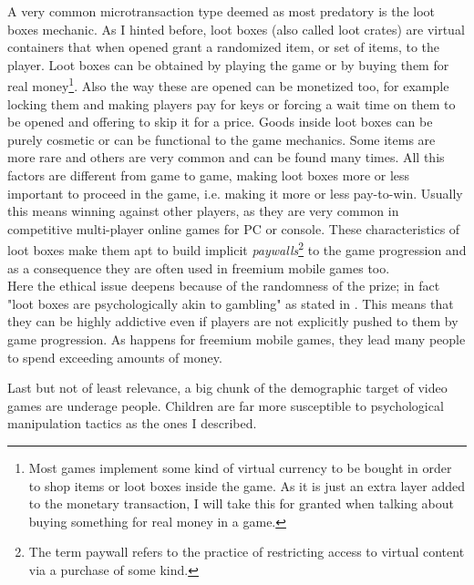 \documentclass[10pt,a4paper]{article}
\begin{document}
A very common microtransaction type deemed as most predatory is the loot boxes mechanic. 
As I hinted before, loot boxes (also called loot crates) are virtual containers that when opened grant a randomized item, or set of items, to the player. 
Loot boxes can be obtained by playing the game or by buying them for real money\footnote{Most games implement some kind of virtual currency to be bought in order to shop items or loot boxes inside the game. 
As it is just an extra layer added to the monetary transaction, I will take this for granted when talking about buying something for real money in a game.}.
Also the way these are opened can be monetized too, for example locking them and making players pay for keys or forcing a wait time on them to be opened and offering to skip it for a price. 
Goods inside loot boxes can be purely cosmetic or can be functional to the game mechanics. 
Some items are more rare and others are very common and can be found many times.
All this factors are different from game to game, making loot boxes more or less important to proceed in the game, i.e. making it more or less pay-to-win. 
Usually this means winning against other players, as they are very common in competitive multi-player online games for PC or console. 
These characteristics of loot boxes make them apt to build implicit \textit{paywalls}\footnote{The term paywall refers to the practice of restricting access to virtual content via a purchase of some kind.} to the game progression and as a consequence they are often used in freemium mobile games too.\\
Here the ethical issue deepens because of the randomness of the prize; in fact "loot boxes are psychologically akin to gambling" as stated in \parencite{gambl}.
This means that they can be highly addictive even if players are not explicitly pushed to them by game progression.
As happens for freemium mobile games, they lead many people to spend exceeding amounts of money.

Last but not of least relevance, a big chunk of the demographic target of video games are underage people. Children are far more susceptible to psychological manipulation tactics as the ones I described.
%
\end{document}
